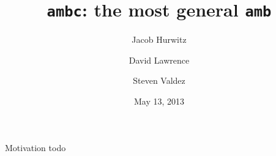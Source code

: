 \documentclass[14pt]{beamer}
\title{\texttt{ambc}: the most general \texttt{amb}}
\author[dlaw, dvorak42, jhurwitz]
  {Jacob Hurwitz \and David Lawrence \and Steven Valdez}
\date{May 13, 2013}
\begin{document}
\titlepage

\begin{frame}{Motivation}
  todo
\end{frame}
\end{document}
